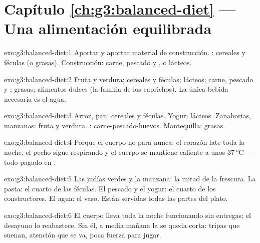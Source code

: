 \section*{Capítulo \ref{ch:g3:balanced-diet} --- Una alimentación equilibrada}

\begin{solution}{exo:g3:balanced-diet:1}
Aportar  y aportar material de construcción. : cereales
y féculas (o grasas). Construcción: carne, pescado y , o
lácteos.
\end{solution}

\begin{solution}{exo:g3:balanced-diet:2}
Fruta y verdura; cereales y féculas; lácteos; carne, pescado y ;
grasas; alimentos dulces (la familia de los caprichos). La única
bebida necesaria es el agua.
\end{solution}

\begin{solution}{exo:g3:balanced-diet:3}
Arroz, pan: cereales y féculas. Yogur: lácteos. Zanahorias, manzanas:
fruta y verdura. : carne-pescado-huevos. Mantequilla: grasas.
\end{solution}

\begin{solution}{exo:g3:balanced-diet:4}
Porque el cuerpo no para nunca: el corazón late toda la noche, el
pecho sigue respirando y el cuerpo se mantiene caliente a unos
$\qty{37}{\degreeCelsius}$ --- todo pagado en .
\end{solution}

\begin{solution}{exo:g3:balanced-diet:5}
Las judías verdes y la manzana: la mitad de la frescura. La pasta: el
cuarto de las féculas. El pescado y el yogur: el cuarto de los
constructores. El agua: el vaso. Están servidas todas las partes del
plato.
\end{solution}

\begin{solution}{exo:g3:balanced-diet:6}
El cuerpo lleva toda la noche funcionando sin entregas; el desayuno lo
reabastece. Sin él, a media mañana la  se queda corta: tripas
que suenan, atención que se va, poca fuerza para jugar.
\end{solution}

